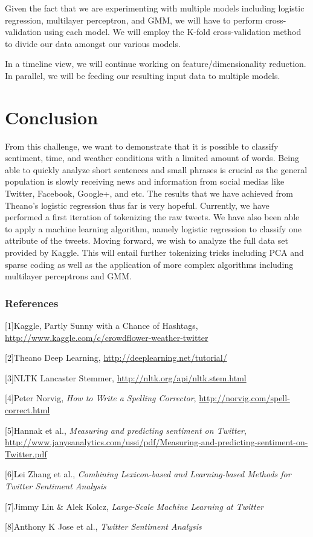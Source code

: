 \documentclass{article}
\begin{document}
Given the fact that we are experimenting with multiple models including logistic regression, multilayer perceptron, and GMM, we will have to perform cross-validation using each model. We will employ the K-fold cross-validation method to divide our data amongst our various models.

In a timeline view, we will continue working on feature/dimensionality reduction. In parallel, we will be feeding our resulting input data to multiple models.

\section{Conclusion}
From this challenge, we want to demonstrate that it is possible to classify sentiment, time, and weather conditions with a limited amount of words. Being able to quickly analyze short sentences and small phrases is crucial as the general population is slowly receiving news and information from social medias like Twitter, Facebook, Google+, and etc. The results that we have achieved from Theano's logistic regression thus far is very hopeful. Currently, we have performed a first iteration of tokenizing the raw tweets. We have also been able to apply a machine learning algorithm, namely logistic regression to classify one attribute of the tweets. Moving forward, we wish to analyze the full data set provided by Kaggle. This will entail further tokenizing tricks including PCA and sparse coding as well as the application of more complex algorithms including multilayer perceptrons and GMM.

\subsubsection*{References}

\small{
	[1]Kaggle, Partly Sunny with a Chance of Hashtags, \url{http://www.kaggle.com/c/crowdflower-weather-twitter}
	
	[2]Theano Deep Learning, \url{http://deeplearning.net/tutorial/}
	
	[3]NLTK Lancaster Stemmer, \url{http://nltk.org/api/nltk.stem.html}
	
	[4]Peter Norvig, {\it How to Write a Spelling Corrector}, \url{http://norvig.com/spell-correct.html}

	[5]Hannak et al., {\it Measuring and predicting sentiment on Twitter}, \url{http://www.janysanalytics.com/ussi/pdf/Measuring-and-predicting-sentiment-on-Twitter.pdf}

	[6]Lei Zhang et al., {\it Combining Lexicon-based and Learning-based Methods for Twitter Sentiment Analysis}

	[7]Jimmy Lin \& Alek Kolcz, {\it Large-Scale Machine Learning at Twitter}

	[8]Anthony K Jose et al., {\it Twitter Sentiment Analysis}
}
\end{document}
